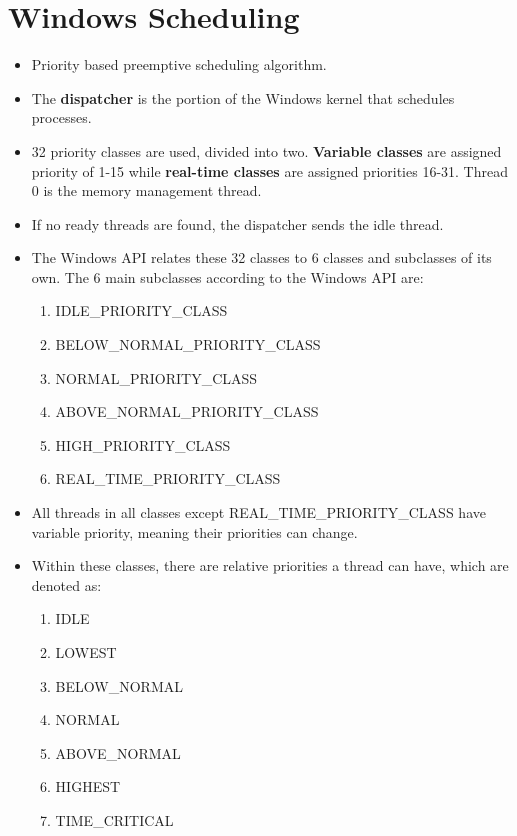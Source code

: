 \documentclass{article}
\theoremstyle{plain}
\theoremstyle{definition}
\begin{document}
\section{Windows Scheduling}
\begin{itemize}
    \item Priority based preemptive scheduling algorithm. 
    
    \item The \textbf{dispatcher} is the portion of the Windows kernel that schedules processes.
    
    \item 32 priority classes are used, divided into two. \textbf{Variable classes} are assigned priority of 1-15 while \textbf{real-time classes} are assigned priorities 16-31. Thread 0 is the memory management thread. 
    
    \item If no ready threads are found, the dispatcher sends the idle thread.
    
    \item The Windows API relates these 32 classes to 6 classes and subclasses of its own. The 6 main subclasses according to the Windows API are:
    \begin{enumerate}
        \item IDLE\_PRIORITY\_CLASS
        \item BELOW\_NORMAL\_PRIORITY\_CLASS
        \item NORMAL\_PRIORITY\_CLASS
        \item ABOVE\_NORMAL\_PRIORITY\_CLASS
        \item HIGH\_PRIORITY\_CLASS
        \item REAL\_TIME\_PRIORITY\_CLASS
    \end{enumerate}
    
    \item All threads in all classes except REAL\_TIME\_PRIORITY\_CLASS have variable priority, meaning their priorities can change.
    
    \item Within these classes, there are relative priorities a thread can have, which are denoted as:
    \begin{enumerate}
        \item IDLE
        \item LOWEST
        \item BELOW\_NORMAL
        \item NORMAL
        \item ABOVE\_NORMAL
        \item HIGHEST
        \item TIME\_CRITICAL
    \end{enumerate}


\end{itemize}
\end{document}
